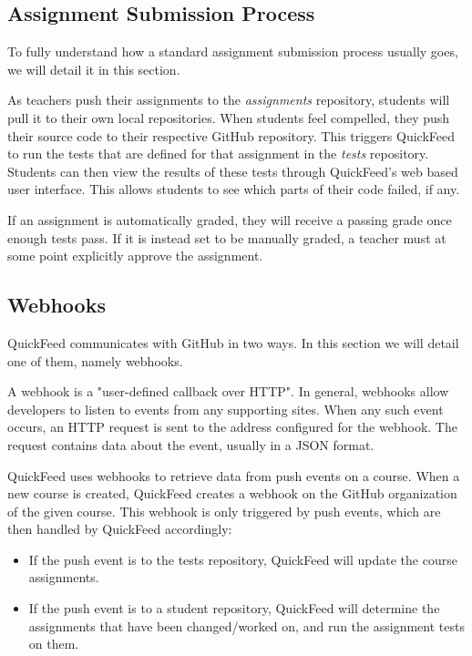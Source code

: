 \subsection{Assignment Submission Process}

To fully understand how a standard assignment submission process usually goes, we will detail it in this section.

As teachers push their assignments to the \textit{assignments} repository, students will pull it to their own local repositories.
When students feel compelled, they push their source code to their respective GitHub repository.
This triggers QuickFeed to run the tests that are defined for that assignment in the \textit{tests} repository.
Students can then view the results of these tests through QuickFeed's web based user interface.  
This allows students to see which parts of their code failed, if any.

If an assignment is automatically graded, they will receive a passing grade once enough tests pass.
If it is instead set to be manually graded, a teacher must at some point explicitly approve the assignment.

\subsection{Webhooks}

QuickFeed communicates with GitHub in two ways.
In this section we will detail one of them, namely webhooks.

A webhook is a "user-defined callback over HTTP". %
In general, webhooks allow developers to listen to events from any supporting sites.
When any such event occurs, an HTTP request is sent to the address configured for the webhook.
The request contains data about the event, usually in a JSON format.

QuickFeed uses webhooks to retrieve data from push events on a course.
When a new course is created, QuickFeed creates a webhook on the GitHub organization of the given course.
This webhook is only triggered by push events, which are then handled by QuickFeed accordingly:

\begin{itemize}
    \item If the push event is to the tests repository, QuickFeed will update the course assignments.
    \item If the push event is to a student repository, QuickFeed will determine the assignments that have been changed/worked on, 
    and run the assignment tests on them.
\end{itemize}

